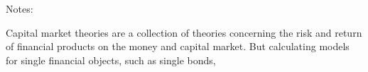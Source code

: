 Notes: 

Capital market theories are a collection of theories concerning the risk and return of financial products on the money and capital market. But calculating models for single financial objects, such as single bonds, 